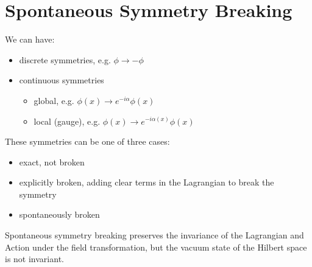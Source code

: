 \documentclass[a4paper, 11pt, normalem]{report}
\begin{document}
\section{Spontaneous Symmetry Breaking}
\begin{multicols}{2}
We can have:
\begin{itemize}
    \item discrete symmetries, e.g. $\phi\to-\phi$
    \item continuous symmetries
        \begin{itemize}
            \item global, e.g. $\phi(x)\to e^{-i\alpha}\phi(x)$
            \item local (gauge), e.g. $\phi(x)\to e^{-i\alpha(x)}\phi(x)$
        \end{itemize}
\end{itemize}
\columnbreak
These symmetries can be one of three cases:
\begin{itemize}
    \item exact, not broken
    \item explicitly broken, adding clear terms in the Lagrangian to break the symmetry
    \item spontaneously broken
\end{itemize}
\end{multicols}
Spontaneous symmetry breaking preserves the invariance of the Lagrangian and Action under the field transformation, but the vacuum state of the Hilbert space is not invariant.
\end{document}
